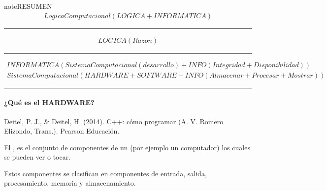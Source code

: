 \documentclass[letterpaper,10pt,spanish]{sphinxmanual}
\begin{document}
\begin{sphinxadmonition}{note}{RESUMEN}
\begin{equation*}
\begin{split} LogicaComputacional(LOGICA + INFORMATICA) \end{split}
\end{equation*}

\bigskip\hrule\bigskip

\begin{equation*}
\begin{split} LOGICA(Razon) \end{split}
\end{equation*}

\bigskip\hrule\bigskip

\begin{equation*}
\begin{split} INFORMATICA(SistemaComputacional(desarrollo) + INFO(Integridad + Disponibilidad))\end{split}
\end{equation*}\begin{equation*}
\begin{split} SistemaComputacional(HARDWARE + SOFTWARE + INFO(Almacenar + Procesar + Mostrar))\end{split}
\end{equation*}\end{sphinxadmonition}


\bigskip\hrule\bigskip



\paragraph{¿Qué es el HARDWARE?}
\label{\detokenize{cursos/logica8/recursos/T01:que-es-el-hardware}}
\sphinxAtStartPar
%
\begin{footnote}[1]\sphinxAtStartFootnote
Deitel, P. J., \& Deitel, H. (2014). C++: cómo programar (A. V. Romero Elizondo, Trans.). Pearson Educación.
%
\end{footnote} El , es el conjunto de componentes de un  (por ejemplo un computador) los cuales se pueden ver o tocar.

\sphinxAtStartPar
Estos componentes se clasifican en componentes de entrada, salida, procesamiento, memoria y almacenamiento.
\end{document}
